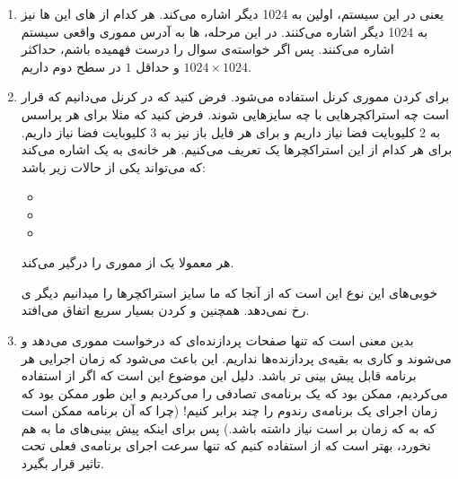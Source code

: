 \begin{enumerate}
    \item یعنی در این سیستم، اولین
    به 1024
    دیگر اشاره می‌کند. هر کدام از
    های
    این
    ها
    نیز به 1024
    دیگر اشاره می‌کنند. در این مرحله،
    ها
    به آدرس مموری واقعی سیستم اشاره می‌کنند.
    پس اگر خواسته‌ی سوال را درست فهمیده باشم، حداکثر
    $1024 \times 1024$
    و حداقل
    $1$
    در سطح دوم داریم.
    \item {}
    برای  کردن مموری کرنل استفاده می‌شود.
    فرض کنید که در کرنل می‌دانیم که قرار است چه استراکچر‌هایی با چه سایز‌هایی
    شوند. فرض کنید که مثلا برای هر پراسس به 2 کلیوبایت فضا نیاز داریم و برای هر فایل باز نیز به 3 کلیوبایت
    فضا نیاز داریم. برای هر کدام از این استراکچر‌ها یک
    تعریف می‌کنیم. هر خانه‌ی
    به یک
    اشاره می‌کند که می‌تواند یکی از حالات زیر باشد:
    \begin{itemize}
        \item {}
        \item {}
        \item {}
    \end{itemize}
    هر
    معمولا یک
    از مموری را درگیر می‌کند.

    خوبی‌های این نوع
    این است که از آنجا که ما سایز استراکچر‌ها را میدانیم دیگر
    ی
    رخ نمی‌دهد. همچنین
     و 
    کردن بسیار سریع اتفاق می‌افتد.
    \item {} بدین معنی است که
    تنها صفحات پردازنده‌ای که درخواست مموری می‌دهد
     و 
    می‌شوند و کاری به بقیه‌ی پردازنده‌ها نداریم. این باعث می‌شود که زمان اجرایی هر برنامه قابل پیش بینی تر باشد.
    دلیل این موضوع این است که اگر از
    استفاده می‌کردیم، ممکن بود که
    یک برنامه‌ی تصادفی را
    می‌کردیم و این طور ممکن بود که زمان اجرای یک برنامه‌ی رندوم را چند برابر کنیم!
    (چرا که آن برنامه ممکن است که به  که زمان بر است نیاز داشته باشد.)
    پس برای اینکه پیش بینی‌های ما به هم نخورد، بهتر است که از
    استفاده کنیم که تنها سرعت اجرای برنامه‌ی فعلی تحت تاثیر قرار بگیرد.
\end{enumerate}
